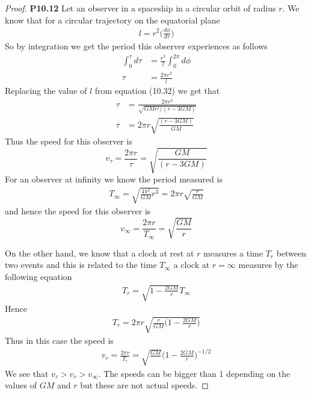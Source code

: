\documentclass[11pt]{article}
\theoremstyle{definition}
\begin{document}
\begin{proof}{\textbf{P10.12}}
    Let an observer in a spaceship in a circular orbit of radius $r$. We know
    that for a circular trajectory on the equatorial plane 
    \begin{align*}
        l = r^2\bigg(\frac{d\phi}{d\tau}\bigg)
    \end{align*}
    So by integration we get the period this observer experiences as follows
    \begin{align*}
        \int_0^\tau d\tau &= \frac{r^2}{l}\int_0^{2\pi}d\phi\\
        \tau &= \frac{2\pi r^2}{l}
    \end{align*}
    Replacing the value of $l$ from equation (10.32) we get that
    \begin{align*}
        \tau &= \frac{2\pi r^2}{\sqrt{GMr^2/(r - 3GM)}}\\
        \tau &= 2\pi r\sqrt{\frac{(r - 3GM)}{GM}}
    \end{align*}
    Thus the speed for this observer is
    $$v_\tau = \frac{2\pi r}{\tau} = \sqrt{\frac{GM}{(r - 3GM)}}$$
    For an observer at infinity we know the period measured is
    \begin{align*}
        T_\infty = \sqrt{\frac{4\pi^2}{GM}r^3} = 2\pi r \sqrt{\frac{r}{GM}}
    \end{align*}
    and hence the speed for this observer is
    $$v_\infty = \frac{2\pi r}{T_\infty} = \sqrt{\frac{GM}{r}}$$

    On the other hand, we know that a clock at rest at $r$ measures a time
    $T_r$ between two events and this is related to the time $T_\infty$
    a clock at $r = \infty$ measures by the following equation
    \begin{align*}
        T_r = \sqrt{1 - \frac{2GM}{r}} T_\infty
    \end{align*}
    Hence
    \begin{align*}
        T_r = 2\pi r \sqrt{\frac{r}{GM}\bigg(1 - \frac{2GM}{r}\bigg)} 
    \end{align*}
    Thus in this case the speed is
    \begin{align*}
        v_r = \frac{2\pi r}{T_r}
        =\sqrt{\frac{GM}{}}\bigg(1 - \frac{2GM}{r}\bigg)^{-1/2}
    \end{align*}
    We see that $v_\tau > v_r > v_\infty$. The speeds can be bigger than 1
    depending on the values of $GM$ and $r$ but these are not actual speeds.
\end{proof}
\cleardoublepage
\end{document}
